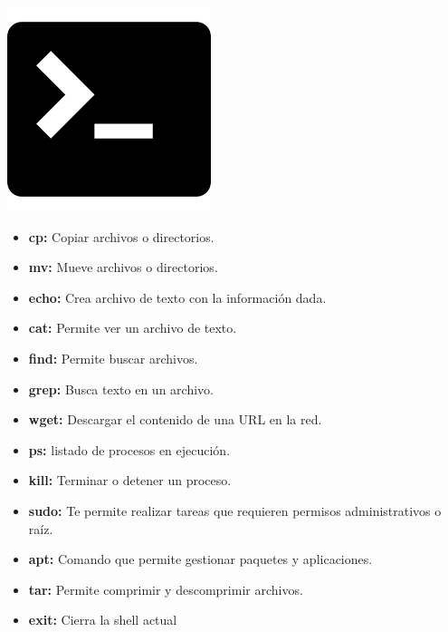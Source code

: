 \documentclass[10pt,xcolor={dvipsnames}]{beamer}
\begin{document}
\begin{frame}
\begin{center}
\includegraphics[scale=0.2]{Figures/terminal}
\end{center}
\begin{itemize}
\item<1-|alert@1> \textbf{cp:} Copiar archivos o directorios.
\item<2-|alert@2> \textbf{mv:} Mueve archivos o directorios.
\item<3-|alert@3> \textbf{echo:} Crea archivo de texto con la información dada.
\item<4-|alert@4> \textbf{cat:} Permite ver un archivo de texto.
\item<5-|alert@5> \textbf{find:} Permite buscar archivos.
\item<6-|alert@6> \textbf{grep:} Busca texto en un archivo.
\item<7-|alert@7> \textbf{wget:} Descargar el contenido de una URL en la red.
\item<8-|alert@8> \textbf{ps:} listado de procesos en ejecución.
\item<9-|alert@9> \textbf{kill:} Terminar o detener un proceso.
\item<10-|alert@10> \textbf{sudo:} Te permite realizar tareas que requieren permisos administrativos o raíz.
\item<11-|alert@11> \textbf{apt:} Comando que permite gestionar paquetes y aplicaciones.
\item<12-|alert@12> \textbf{tar:} Permite comprimir y descomprimir archivos.
\item<13-|alert@13> \textbf{exit:} Cierra la shell actual
\end{itemize}
\end{frame}

{\1
\begin{frame}
\end{frame}}
\end{document}
